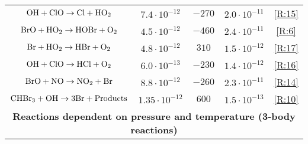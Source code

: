 \begin{table}[ht]
{\begin{tabular}{|c|ccc|c|c|c|l|}
$\mathrm{OH} + \mathrm{ClO} \rightarrow \mathrm{Cl} + \mathrm{HO_2}$         & \multicolumn{1}{c|}{$7.4\cdot10^{-12}$}   & \multicolumn{2}{c|}{$-270$}                                                  & $2.0\cdot10^{-11}$                             & \multicolumn{3}{c|}{\ref{R:15}}                                                                                        \\
$\mathrm{BrO} + \mathrm{HO_2} \rightarrow \mathrm{HOBr} + \mathrm{O_2}$      & \multicolumn{1}{c|}{$4.5\cdot10^{-12}$}   & \multicolumn{2}{c|}{$-460$}                                                  & $2.4\cdot10^{-11}$                             & \multicolumn{3}{c|}{\ref{R:6}}                                                                                         \\
$\mathrm{Br} + \mathrm{HO_2} \rightarrow \mathrm{HBr} + \mathrm{O_2}$        & \multicolumn{1}{c|}{$4.8\cdot10^{-12}$}   & \multicolumn{2}{c|}{$310$}                                                   & $1.5\cdot10^{-12}$                             & \multicolumn{3}{c|}{\ref{R:17}}                                                                                        \\
$\mathrm{OH} + \mathrm{ClO} \rightarrow \mathrm{HCl} + \mathrm{O_2}$         & \multicolumn{1}{c|}{$6.0\cdot10^{-13}$}   & \multicolumn{2}{c|}{$-230$}                                                  & $1.4\cdot10^{-12}$                             & \multicolumn{3}{c|}{\ref{R:16}}                                                                                        \\
$\mathrm{BrO} + \mathrm{NO} \rightarrow \mathrm{NO_2} + \mathrm{Br}$         & \multicolumn{1}{c|}{$8.8\cdot10^{-12}$}   & \multicolumn{2}{c|}{$-260$}                                                  & $2.3\cdot10^{-11}$                             & \multicolumn{3}{c|}{\ref{R:14}}                                                                                        \\
$\mathrm{CHBr_3} + \mathrm{OH} \rightarrow 3\mathrm{Br} + \mathrm{Products}$ & \multicolumn{1}{c|}{$1.35\cdot10^{-12}$}  & \multicolumn{2}{c|}{$600$}                                                   & $1.5\cdot10^{-13}$                             & \multicolumn{3}{c|}{\ref{R:10}}                                                                                        \\ \hline
\multicolumn{8}{|c|}{\textbf{Reactions dependent on pressure and temperature (3-body reactions)}}                                                                                                                                                                                                                                                                         \\ \hline

\end{tabular}}
\end{table}
